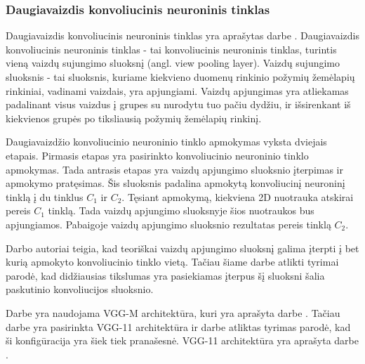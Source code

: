 \subsubsection{Daugiavaizdis konvoliucinis neuroninis tinklas}

Daugiavaizdis konvoliucinis neuroninis tinklas yra aprašytas darbe \cite{cnnExp1}. Daugiavaizdis konvoliucinis neuroninis tinklas - tai konvoliucinis neuroninis tinklas, turintis vieną vaizdų sujungimo sluoksnį (angl. view pooling layer). Vaizdų sujungimo sluoksnis - tai sluoksnis, kuriame kiekvieno duomenų rinkinio požymių žemėlapių rinkiniai, vadinami vaizdais, yra apjungiami. Vaizdų apjungimas yra atliekamas padalinant visus vaizdus į grupes su nurodytu tuo pačiu dydžiu, ir išsirenkant iš kiekvienos grupės po tiksliausią požymių žemėlapių rinkinį.

Daugiavaizdžio konvoliucinio neuroninio tinklo apmokymas vyksta dviejais etapais. Pirmasis etapas yra pasirinkto konvoliucinio neuroninio tinklo apmokymas. Tada antrasis etapas yra vaizdų apjungimo sluoksnio įterpimas ir apmokymo pratęsimas. Šis sluoksnis padalina apmokytą konvoliucinį neuroninį tinklą į du tinklus $C_1$ ir $C_2$. Tęsiant apmokymą, kiekviena 2D nuotrauka atskirai pereis $C_1$ tinklą. Tada vaizdų apjungimo sluoksnyje šios nuotraukos bus apjungiamos. Pabaigoje vaizdų apjungimo sluoksnio rezultatas pereis tinklą $C_2$.


Darbo \cite{cnnExp1} autoriai teigia, kad teoriškai vaizdų apjungimo sluoksnį galima įterpti į bet kurią apmokyto konvoliucinio tinklo vietą. Tačiau šiame darbe atlikti tyrimai parodė, kad didžiausias tikslumas yra pasiekiamas įterpus šį sluoksni šalia paskutinio konvoliucijos sluoksnio.

Darbe \cite{cnnExp1} yra naudojama VGG-M architektūra, kuri yra aprašyta darbe \cite{vggM}. Tačiau darbe \cite{cnnExp2} yra pasirinkta VGG-11 architektūra ir darbe \cite{cnnExp2} atliktas tyrimas parodė, kad ši konfigūracija yra šiek tiek pranašesnė. VGG-11 architektūra yra aprašyta darbe \cite{vgg11}.
